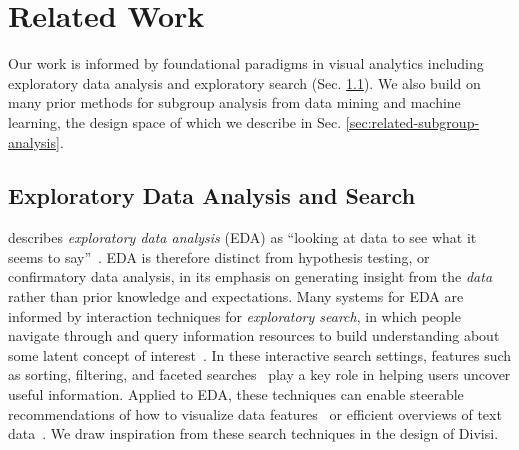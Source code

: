 \section{Related Work}
Our work is informed by foundational paradigms in visual analytics including exploratory data analysis and exploratory search (Sec. \ref{sec:related-eda}). 
We also build on many prior methods for subgroup analysis from data mining and machine learning, the design space of which we describe in Sec. \ref{sec:related-subgroup-analysis}.

\subsection{Exploratory Data Analysis and Search}
\label{sec:related-eda}

\citeauthor{tukey_exploratory_1970} describes \textit{exploratory data analysis} (EDA) as ``looking at data to see what it seems to say''~\cite{tukey_exploratory_1970}.
EDA is therefore distinct from hypothesis testing, or confirmatory data analysis, in its emphasis on generating insight from the \textit{data} rather than prior knowledge and expectations.
Many systems for EDA are informed by interaction techniques for \textit{exploratory search}, in which people navigate through and query information resources to build understanding about some latent concept of interest~\cite{white_exploratory_2009}.
In these interactive search settings, features such as sorting, filtering, and faceted searches~\cite{yee_2003_faceted} play a key role in helping users uncover useful information.
Applied to EDA, these techniques can enable steerable recommendations of how to visualize data features~\cite{wongsuphasawat_voyager_2016,lee_2021_lux} or efficient overviews of text data~\cite{felix_texttile_2017}.
We draw inspiration from these search techniques in the design of Divisi.

